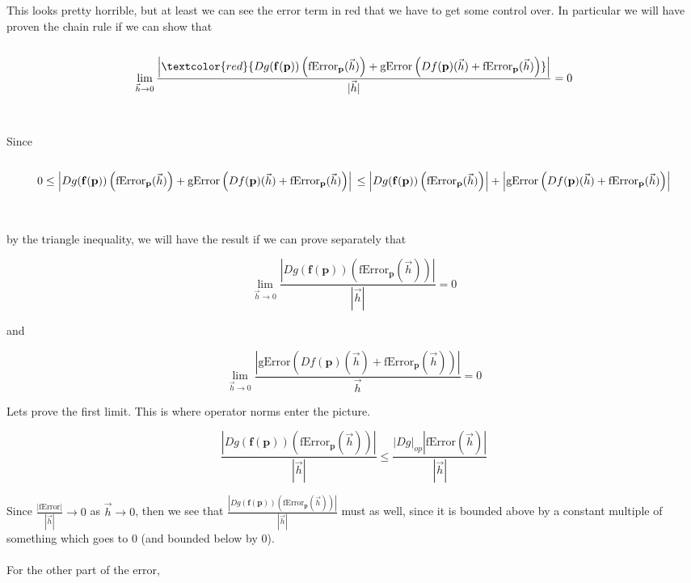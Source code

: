 \documentclass{ximera}
\begin{document}
	This looks pretty horrible, but at least we can see the error term in red that we have to get some control over.  
	In particular we will have proven the chain rule if we can show that
	\\
	\\
	\[
		\displaystyle\lim_{\vec{h} \to 0} \frac{\left|\textcolor{red}{Dg(\mathbf{f(p)})\left(\text{fError}_{\mathbf{p}}(\vec{h})\right) + \text{gError}\left(Df(\mathbf{p})(\vec{h})+\text{fError}_{\mathbf{p}}(\vec{h})\right)}\right|}{|\vec{h}|} = 0
	\]
	\\
	\\
	Since 
	\\
	\\
	\[0 \leq \left|Dg(\mathbf{f(p)})\left(\text{fError}_{\mathbf{p}}(\vec{h})\right) + \text{gError}\left(Df(\mathbf{p})(\vec{h})+\text{fError}_{\mathbf{p}}(\vec{h})\right) \right|\\\\ \leq \left|Dg(\mathbf{f(p)})\left(\text{fError}_{\mathbf{p}}(\vec{h})\right)\right| + \left| \text{gError}\left(Df(\mathbf{p})(\vec{h})+\text{fError}_{\mathbf{p}}(\vec{h})\right)\right|\]
	\\
	\\
	by the triangle inequality, we will have the result if we can prove separately that
	
	\[
		\displaystyle\lim_{\vec{h} \to 0} \frac{\left|Dg(\mathbf{f(p)})\left(\text{fError}_{\mathbf{p}}(\vec{h})\right)\right|}{\left|\vec{h}\right|}  = 0
	\]
	
	and 
	
	\[
	\displaystyle\lim_{\vec{h} \to 0} \frac{ \left| \text{gError}\left(Df(\mathbf{p})(\vec{h})+\text{fError}_{\mathbf{p}}(\vec{h})\right)\right|}{\vec{h}} = 0
	\]
	
	Lets prove the first limit.  This is where operator norms enter the picture.
	
\[
	\frac{\left|Dg(\mathbf{f(p)})\left(\text{fError}_{\mathbf{p}}(\vec{h})\right)\right|}{\left|\vec{h}\right|} \leq \frac{\left|Dg\right|_{op}|\text{fError}(\vec{h})|}{|\vec{h}|}
\]

Since $\frac{\left|\text{fError}\right|}{\left|\vec{h}\right|} \to 0$ as $\vec{h} \to 0$, then we see that $\frac{\left|Dg(\mathbf{f(p)})\left(\text{fError}_{\mathbf{p}}(\vec{h})\right)\right|}{\left|\vec{h}\right|}$ 
must as well, since it is bounded above by a constant multiple of something which goes to $0$ (and bounded below by $0$).
\\
\\
For the other part of the error,
\end{document}
